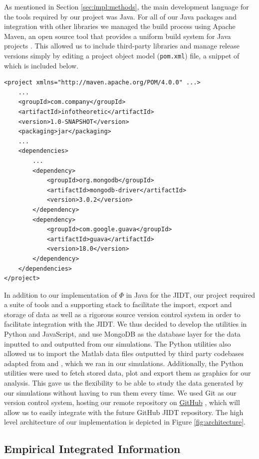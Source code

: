 \documentclass[a4paper,11pt]{article}
\begin{document}
As mentioned in Section \ref{sec:impl:methods}, the main development language for the tools required by our project was Java. For all of our Java packages and integration with other libraries we managed the build process using Apache Maven, an open source tool that provides a uniform build system for Java projects \cite{TheApacheSoftwareFoundation}. This allowed us to include third-party libraries and manage release versions simply by editing a project object model (\texttt{pom.xml}) file, a snippet of which is included below.

\begin{verbatim}
<project xmlns="http://maven.apache.org/POM/4.0.0" ...>
	...
	<groupId>com.company</groupId>
	<artifactId>infotheoretic</artifactId>
	<version>1.0-SNAPSHOT</version>
	<packaging>jar</packaging>
	...
	<dependencies> 
		...
		<dependency>
			<groupId>org.mongodb</groupId>
			<artifactId>mongodb-driver</artifactId>
			<version>3.0.2</version>
		</dependency>
		<dependency>
			<groupId>com.google.guava</groupId>
			<artifactId>guava</artifactId>
			<version>18.0</version>
		</dependency>
	</dependencies>
</project>
\end{verbatim}

In addition to our implementation of $\Phi$ in Java for the JIDT, our project required a suite of tools and a supporting stack to facilitate the import, export and storage of data as well as a rigorous source version control system in order to facilitate integration with the JIDT. We thus decided to develop the utilities in Python and JavaScript, and use MongoDB \cite{MongoDB} as the database layer for the data inputted to and outputted from our simulations. The Python utilities also allowed us to import the Matlab data files outputted by third party codebases adapted from \cite{Shanahan2010} and \cite{Bhowmik2013}, which we ran in our simulations. Additionally, the Python utilities were used to fetch stored data, plot and export them as graphics for our analysis. This gave us the flexibility to be able to study the data generated by our simulations without having to run them every time. We used Git as our version control system, hosting our remote repository on \href{http://github.com}{GitHub} \cite{GitHub}, which will allow us to easily integrate with the future GitHub JIDT repository. The high level architecture of our implementation is depicted in Figure \ref{fig:architecture}.

\subsection{Empirical Integrated Information}
\label{sec:impl:phi-e}
\end{document}
